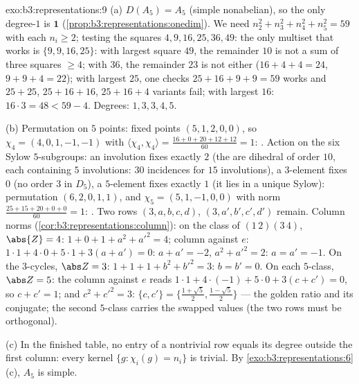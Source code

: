 \begin{solution}{exo:b3:representations:9}
(a) $D(A_5) = A_5$ (simple nonabelian), so the only degree-$1$
 is $\mathbf 1$
(\cref{prop:b3:representations:onedim}). We need $n_2^2 + n_3^2
+ n_4^2 + n_5^2 = 59$ with each $n_i \geq 2$; testing the
squares $4, 9, 16, 25, 36, 49$: the only multiset that works is
$\{9, 9, 16, 25\}$: with largest square $49$, the remainder $10$
is not a sum of three squares $\geq 4$; with $36$, the remainder
$23$ is not either ($16 + 4 + 4 = 24$, $9 + 9 + 4 = 22$); with
largest $25$, one checks $25 + 16 + 9 + 9 = 59$ works and $25 +
25$, $25 + 16 + 16$, $25 + 16 + 4$ variants fail; with largest
$16$: $16\cdot3 = 48 < 59 - 4$. Degrees: $1, 3, 3, 4, 5$.

(b) Permutation on $5$ points: fixed points $(5, 1, 2, 0, 0)$,
so $\chi_4 = (4, 0, 1, -1, -1)$ with
$\langle\chi_4,\chi_4\rangle = \frac{16 + 0 + 20 + 12 + 12}{60}
= 1$: . Action on the six Sylow $5$-subgroups: an
involution fixes exactly $2$ (the  are dihedral of
order $10$, each containing $5$ involutions: $30$ incidences
for $15$ involutions), a $3$-element fixes $0$ (no order $3$ in
$D_5$), a $5$-element fixes exactly $1$ (it lies in a unique
Sylow): permutation  $(6, 2, 0, 1, 1)$, and $\chi_5 =
(5, 1, -1, 0, 0)$ with norm $\frac{25 + 15 + 20 + 0 + 0}{60} =
1$: . Two rows $(3, a, b, c, d)$, $(3, a', b', c',
d')$ remain. Column norms
(\cref{cor:b3:representations:column}): on the class of
$(1\,2)(3\,4)$, $\abs{Z} = 4$: $1 + 0 + 1 + a^2 + a'^2 = 4$;
column against $e$: $1\cdot1 + 4\cdot 0 + 5\cdot1 + 3(a + a') =
0$: $a + a' = -2$, $a^2 + a'^2 = 2$: $a = a' = -1$. On the
$3$-cycles, $\abs Z = 3$: $1 + 1 + 1 + b^2 + b'^2 = 3$: $b = b'
= 0$. On each $5$-class, $\abs Z = 5$: the column against $e$
reads $1\cdot 1 + 4\cdot(-1) + 5\cdot 0 + 3(c + c') = 0$, so
$c + c' = 1$; and
$c^2 + c'^2 = 3$: $\{c, c'\} = \bigl\{\frac{1+\sqrt5}2,
\frac{1-\sqrt5}2\bigr\}$ --- the golden ratio and its
conjugate; the second $5$-class carries the swapped values (the
two rows must be orthogonal).

(c) In the finished table, no entry of a nontrivial row equals
its degree outside the first column: every kernel $\{g :
\chi_i(g) = n_i\}$ is trivial. By
\cref{exo:b3:representations:6}(c), $A_5$ is simple.
\end{solution}

